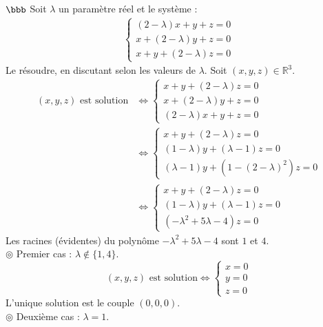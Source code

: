 \documentclass[11pt]{article}
\begin{document}
\begin{exercice}{$\bbb$}{}
    Soit $\lambda$ un paramètre réel et le système :
    \begin{align*}
        \begin{cases}
            (2-\lambda)x + y + z = 0\\
            x + (2-\lambda)y + z = 0\\
            x + y + (2-\lambda)z = 0
        \end{cases}
    \end{align*}
    Le résoudre, en discutant selon les valeurs de $\lambda$.
    \tcblower
    Soit $(x,y,z)\in\mathbb{R}^3$.
    \begin{align*}
        (x,y,z) \text{ est solution}
        &\iff \begin{cases}
            x + y + (2-\lambda)z = 0\\
            x + (2-\lambda)y + z = 0\\
            (2 - \lambda)x + y + z = 0
        \end{cases}\\
        &\iff \begin{cases}
            x+y+(2-\lambda)z =0\\
            (1-\lambda)y + (\lambda-1)z=0\\
            (\lambda-1)y + (1-(2-\lambda)^2)z=0
        \end{cases}\\
        &\iff \begin{cases}
            x + y + (2-\lambda)z = 0\\
            (1-\lambda)y + (\lambda-1)z = 0\\
            (-\lambda^2 + 5\lambda - 4)z = 0
        \end{cases}
    \end{align*}
    Les racines (évidentes) du polynôme $-\lambda^2+5\lambda-4$ sont $1$ et $4$.\\
    $\circledcirc$ Premier cas : $\lambda\notin\{1,4\}$.
    \begin{equation*}
        (x,y,z) \text{ est solution}
        \iff\begin{cases}
            x=0\\
            y=0\\
            z=0
        \end{cases}
    \end{equation*}
    L'unique solution est le couple $(0,0,0)$.\\
    $\circledcirc$ Deuxième cas : $\lambda=1$.

\end{exercice}
\end{document}
